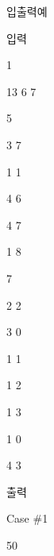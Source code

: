 \documentclass [12pt] {oblivoir}
\begin{document}
입출력예

\vspace{3mm}

입력

\vspace{3mm}

1

13 6 7

5

3 7

1 1

4 6

4 7

1 8

7

2 2

3 0

1 1

1 2

1 3

1 0

4 3

\vspace{5mm}

출력

\vspace{3mm}

Case \#1

50
\end{document}
